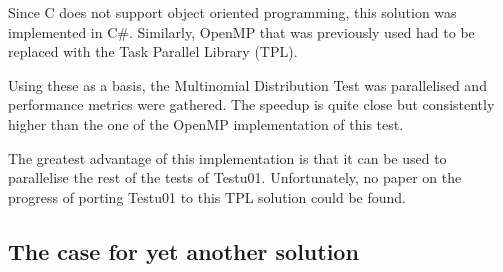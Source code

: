 Since C does not support object oriented programming, this solution was implemented in C\#. Similarly, OpenMP that was previously used had to be replaced with the Task Parallel Library (TPL).

Using these as a basis, the Multinomial Distribution Test was parallelised and performance metrics were gathered. The speedup is quite close but consistently higher than the one of the OpenMP implementation of this test.

The greatest advantage of this implementation is that it can be used to parallelise the rest of the tests of Testu01. Unfortunately, no paper on the progress of porting Testu01 to this TPL solution could be found.

\subsection{The case for yet another solution}
